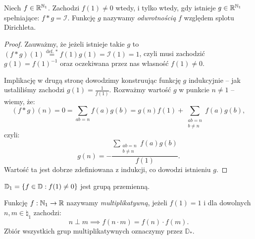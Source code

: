 \begin{theorem}
	\label{nt:dirichletinverse}
	Niech $f \in \mathbb{R}^{\mathbb{N}_1}$.
	Zachodzi $f(1) \neq 0$ wtedy, i tylko wtedy, gdy
	istnieje $g \in \mathbb{R}^{\mathbb{N}_1}$ spełniające: $f * g = \mathcal I$.
	Funkcję $g$ nazywamy \textit{odwrotnością} $f$ względem splotu Dirichleta.
\end{theorem}
\begin{proof}
	Zauważmy, że jeżeli istnieje takie $g$ to $(f * g)(1) \stackrel{\text{def. }*}{=} f(1)g(1) = \mathcal I(1) = 1$,
	czyli musi zachodzić $g(1) = f(1)^{-1}$ oraz oczekiwana przez nas własność $f(1) \neq 0$.

	Implikację w drugą stronę dowodzimy konstruując funkcję $g$ indukcyjnie -- jak ustaliliśmy zachodzi $g(1) = \frac{1}{f(1)}$.
	Rozważmy wartość $g$ w punkcie $n \neq 1$ -- wiemy, że:
	$$(f*g)(n) = 0 = \sum_{ab = n} f(a)g(b) = g(n)f(1) + \sum_{\substack{ab = n \\ b \neq n}} f(a)g(b),$$
	czyli:
	$$g(n) = -\frac{\sum_{\substack{ab = n \\ b \neq n}} f(a)g(b)}{f(1)}.$$
	Wartość ta jest dobrze zdefiniowana z indukcji, co dowodzi istnieniu $g$.

\end{proof}

\begin{corollary}
	$\mathbb D_1 = \set{f \in \mathbb D : f(1) \neq 0}$ jest grupą przemienną.
\end{corollary}

\begin{definition}
	Funkcję $f: \mathbb{N}_1 \to \mathbb{R}$ nazywamy \textit{multiplikatywną}, jeżeli $f(1) = 1$ i dla dowolnych $n, m \in \natural_1$ zachodzi:
	$$n \perp m \implies f(n \cdot m) = f(n) \cdot f(m).$$
	Zbiór wszystkich grup multiplikatywnych oznaczymy przez $\mathbb D_*$.
\end{definition}

